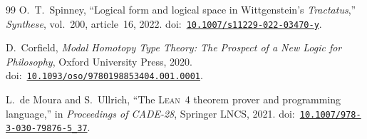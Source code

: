 \documentclass[jsl,bibother]{asl}
\theoremstyle{definition}
\theoremstyle{remark}
\begin{document}
\begin{thebibliography}{99}
O.~T.~Spinney,
``Logical form and logical space in Wittgenstein's
\emph{Tractatus},''
\emph{Synthese}, vol.~200, article~16, 2022.
\newline doi:~\href{https://doi.org/10.1007/s11229-022-03470-y}{\texttt{10.1007/s11229-022-03470-y}}.

D.~Corfield,
\emph{Modal Homotopy Type Theory: The Prospect of a New Logic
for Philosophy},
Oxford University Press, 2020.
\newline doi:~\href{https://doi.org/10.1093/oso/9780198853404.001.0001}{\texttt{10.1093/oso/9780198853404.001.0001}}.

L.~de Moura and S.~Ullrich,
``The \textsc{Lean}~4 theorem prover and programming language,''
in \emph{Proceedings of CADE-28}, Springer LNCS, 2021.
\newline doi:~\href{https://doi.org/10.1007/978-3-030-79876-5_37}{\texttt{10.1007/978-3-030-79876-5\_37}}.

\end{thebibliography}
\end{document}
